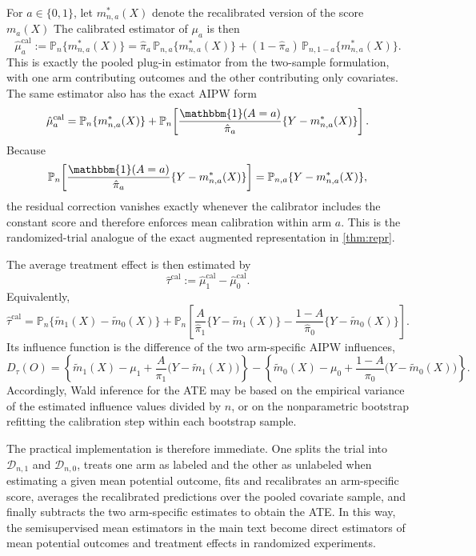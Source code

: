 \documentclass{article}
\theoremstyle{plain}
\theoremstyle{definition}
\newcommand{\1}{\mathbbm{1}}
\begin{document}
For \(a\in\{0,1\}\), let \(m_{n,a}^*(X)\) denote the recalibrated version of the score \(m_a(X)\) The calibrated estimator of \(\mu_a\) is then
\begin{equation}
\label{eq:rct-mua-plugin}
\hat\mu_a^{\mathrm{cal}}
:=
\mathbb P_n\{m_{n,a}^*(X)\}
=
\hat\pi_a\,\mathbb P_{n,a}\{m_{n,a}^*(X)\}
+
(1-\hat\pi_a)\,\mathbb P_{n,1-a}\{m_{n,a}^*(X)\}.
\end{equation}
This is exactly the pooled plug-in estimator from the two-sample formulation, with one arm contributing outcomes and the other contributing only covariates. The same estimator also has the exact AIPW form
\begin{equation}
\label{eq:rct-mua-aipw}
\hat\mu_a^{\mathrm{cal}}
=
\mathbb P_n\{m_{n,a}^*(X)\}
+
\mathbb P_n\!\left[
\frac{\1(A=a)}{\hat\pi_a}\{Y-m_{n,a}^*(X)\}
\right].
\end{equation}
Because
\[
\mathbb P_n\!\left[
\frac{\1(A=a)}{\hat\pi_a}\{Y-m_{n,a}^*(X)\}
\right]
=
\mathbb P_{n,a}\{Y-m_{n,a}^*(X)\},
\]
the residual correction vanishes exactly whenever the calibrator includes the constant score and therefore enforces mean calibration within arm \(a\). This is the randomized-trial analogue of the exact augmented representation in \cref{thm:repr}.


The average treatment effect is then estimated by
\begin{equation}
\label{eq:rct-ate}
\hat\tau^{\mathrm{cal}}
:=
\hat\mu_1^{\mathrm{cal}}-\hat\mu_0^{\mathrm{cal}}.
\end{equation}
Equivalently,
\[
\hat\tau^{\mathrm{cal}}
=
\mathbb P_n\{\tilde m_1(X)-\tilde m_0(X)\}
+
\mathbb P_n\!\left[
\frac{A}{\hat\pi_1}\{Y-\tilde m_1(X)\}
-
\frac{1-A}{\hat\pi_0}\{Y-\tilde m_0(X)\}
\right].
\]
Its influence function is the difference of the two arm-specific AIPW influences,
\[
D_\tau(O)
=
\left\{\tilde m_1(X)-\mu_1+\frac{A}{\pi_1}\bigl(Y-\tilde m_1(X)\bigr)\right\}
-
\left\{\tilde m_0(X)-\mu_0+\frac{1-A}{\pi_0}\bigl(Y-\tilde m_0(X)\bigr)\right\}.
\]
Accordingly, Wald inference for the ATE may be based on the empirical variance of the estimated influence values divided by \(n\), or on the nonparametric bootstrap refitting the calibration step within each bootstrap sample.

The practical implementation is therefore immediate. One splits the trial into \(\mathcal D_{n,1}\) and \(\mathcal D_{n,0}\), treats one arm as labeled and the other as unlabeled when estimating a given mean potential outcome, fits and recalibrates an arm-specific score, averages the recalibrated predictions over the pooled covariate sample, and finally subtracts the two arm-specific estimates to obtain the ATE. In this way, the semisupervised mean estimators in the main text become direct estimators of mean potential outcomes and treatment effects in randomized experiments.  
\end{document}
